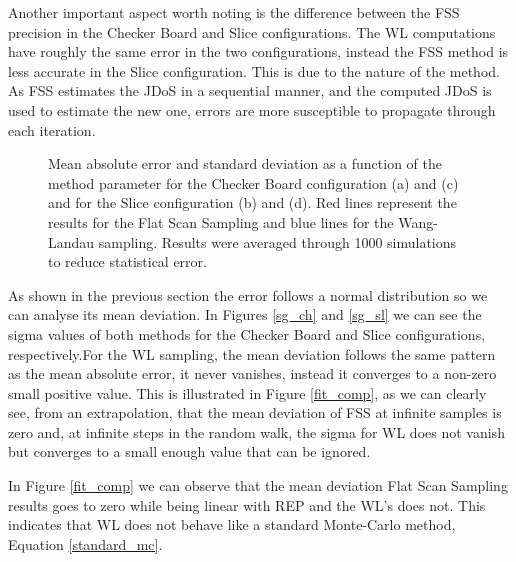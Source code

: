 	Another important aspect worth noting is the difference between the FSS precision in the Checker Board and Slice configurations. The WL computations have roughly the same error in the two configurations, instead the FSS method is less accurate in the Slice configuration. This is due to the nature of the method. As FSS estimates the JDoS in a sequential manner, and the computed JDoS is used to estimate the new one, errors are more susceptible to propagate through each iteration.
	
	\pagebreak
	
\begin{figure}[h]
	\centering

	
	\caption{Mean absolute error and standard deviation as a function of the method parameter for the Checker Board configuration (a) and (c) and for the Slice configuration (b) and (d). Red lines represent the results for the Flat Scan Sampling and blue lines for the Wang-Landau sampling. Results were averaged through 1000 simulations to reduce statistical error.}
\end{figure}

	As shown in the previous section the error follows a normal distribution so we can analyse its mean deviation. In Figures \ref{sg_ch} and \ref{sg_sl} we can see the sigma values of both methods for the Checker Board and Slice configurations, respectively.For the WL sampling, the mean deviation follows the same pattern as the mean absolute error, it never vanishes, instead it converges to a non-zero small positive value. This is illustrated in Figure \ref{fit_comp}, as we can clearly see, from an extrapolation, that the mean deviation of FSS at infinite samples is zero and, at infinite steps in the random walk, the sigma for WL does not vanish but converges to a small enough value that can be ignored.

	In Figure \ref{fit_comp} we can observe that the mean deviation Flat Scan Sampling results goes to zero while being linear with REP and the WL's does not. This indicates that WL does not behave like a standard Monte-Carlo method, Equation \ref{standard_mc}. 

